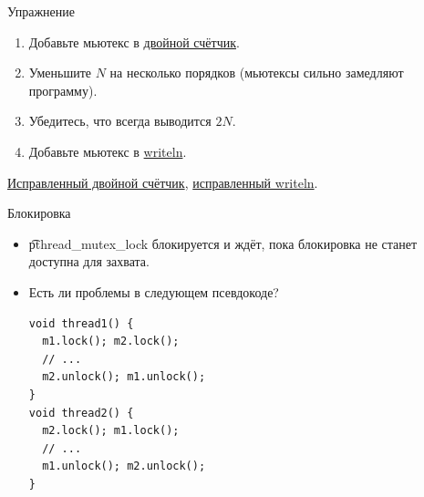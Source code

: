 \begin{frame}{Упражнение}
	\begin{enumerate}
		\item Добавьте мьютекс в \href{https://github.com/yeputons/fall-2016-paradigms/raw/master/161019/sources/08-two-threads.c}{двойной счётчик}.
		\item Уменьшите $N$ на несколько порядков (мьютексы сильно замедляют программу).
		\item Убедитесь, что всегда выводится $2N$.
		\item Добавьте мьютекс в \href{https://github.com/yeputons/fall-2016-paradigms/raw/master/161019/sources/04-writeln-race.c}{writeln}.
	\end{enumerate}
	\href{https://github.com/yeputons/fall-2016-paradigms/raw/master/161019/sources/10-two-threads-good-mutex.c}{Исправленный двойной счётчик},
	\href{https://github.com/yeputons/fall-2016-paradigms/raw/master/161019/sources/11-writeln-mutex.c}{исправленный writeln}.
\end{frame}

\begin{frame}[fragile]{Блокировка}
	\begin{itemize}
		\item \t{pthread\_mutex\_lock} блокируется и ждёт, пока блокировка не станет доступна для захвата.
		\item Есть ли проблемы в следующем псевдокоде?
\begin{verbatim}
void thread1() {
  m1.lock(); m2.lock();
  // ...
  m2.unlock(); m1.unlock();
}
void thread2() {
  m2.lock(); m1.lock();
  // ...
  m1.unlock(); m2.unlock();
}
\end{verbatim}
	\end{itemize}
\end{frame}

